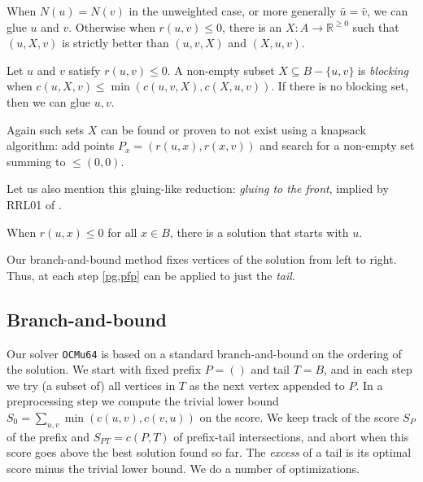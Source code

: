 \documentclass[a4paper,UKenglish,cleveref, autoref, thm-restate]{lipics-v2021}
\begin{document}
\begin{remark}
  When $N(u)=N(v)$ in the unweighted case, or more generally $\bar u=\bar v$, we can glue $u$
    and $v$.
  Otherwise when $r(u,v)\leq 0$, there is an $X : A\to \mathbb R^{\geq 0}$ such that $(u, X, v)$ is
  strictly better than $(u,v,X)$ and $(X,u,v)$.
\end{remark}
\begin{lemma}\label{pg}
    Let $u$ and $v$ satisfy $r(u, v) \leq 0$.
    A non-empty subset $X\subseteq B-\{u,v\}$ is \emph{blocking} when $c(u, X, v) \leq
    \min(c(u, v, X), c(X, u, v))$. If there is no blocking set, then we can glue $u, v$.
\end{lemma}
Again such sets $X$ can be found or proven to not exist using a knapsack
algorithm: add points $P_x = (r(u, x), r(x, v))$ and search for a non-empty
set summing to $\leq{}(0,0)$.

Let us also mention this gluing-like reduction: \emph{gluing to the front}, implied by RRL01 of
\cite{dujmovic_2008}.
\begin{lemma}[Greedy]\label{greedy}
  When $r(u, x)\leq 0$ for all $x\in B$, there is a solution that
  starts with $u$.
\end{lemma}

\begin{remark}
  Our branch-and-bound method fixes vertices of the
solution from left to right. Thus, at each step \cref{pg,pfp} can be applied to
just the \emph{tail}.
\end{remark}


\subsection{Branch-and-bound}
Our solver \texttt{OCMu64} is based on a standard branch-and-bound on the ordering of the
solution.  We start with fixed prefix $P=()$ and tail $T=B$, and in each step we try (a
subset of) all vertices in $T$ as the next vertex appended to $P$.
In a preprocessing step we compute the trivial lower bound $S_0 =
\sum_{u,v}\min(c(u,v),c(v,u))$ on the score.
We keep track of the score $S_P$ of the prefix and $S_{PT}=c(P, T)$ of
prefix-tail intersections, and abort when this score goes above the best
solution found so far. The \emph{excess} of a tail is its optimal score minus
the trivial lower bound. We do a number of optimizations.
\end{document}
